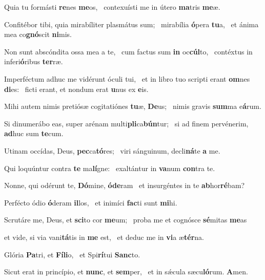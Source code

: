 \item Quia tu formásti \textbf{re}nes \textbf{me}os,~\psstar{} contexuísti me in útero \textbf{ma}tris \textbf{me}æ.

\item Confitébor tibi, quia mirabíliter plasmátus sum;~\pscross{} mirabília \textbf{ó}pera \textbf{tu}a,~\psstar{} et ánima mea co\textbf{gnó}scit \textbf{ni}mis.

\item Non sunt abscóndita ossa mea a te,~\pscross{} cum factus sum \textbf{in} oc\textbf{cúl}to,~\psstar{} contéxtus in inferi\textbf{ó}ribus \textbf{ter}ræ.

\item Imperféctum adhuc me vidérunt óculi tui,~\pscross{} et in libro tuo scripti erant \textbf{om}nes \textbf{di}es:~\psstar{} ficti erant, et nondum erat \textbf{u}nus ex \textbf{e}is.

\item Mihi autem nimis pretiósæ cogitatiónes \textbf{tu}æ, \textbf{De}us;~\psstar{} nimis gravis \textbf{sum}ma e\textbf{á}rum.

\item Si dinumerábo eas, super arénam multi\textbf{pli}ca\textbf{bún}tur;~\psstar{} si ad finem pervénerim, \textbf{ad}huc sum \textbf{te}cum.

\item Utinam occídas, Deus, \textbf{pec}ca\textbf{tó}res;~\psstar{} viri sánguinum, decli\textbf{ná}te \textbf{a} me.

\item Qui loquúntur contra \textbf{te} ma\textbf{lí}gne:~\psstar{} exaltántur in \textbf{va}num \textbf{con}tra te.

\item Nonne, qui odérunt te, \textbf{Dó}mine, \textbf{ó}\textbf{de}ram~\psstar{} et insurgéntes in te \textbf{ab}hor\textbf{ré}bam?

\item Perfécto ódio \textbf{ó}deram \textbf{il}los,~\psstar{} et inimíci \textbf{fac}ti sunt \textbf{mi}hi.

\item Scrutáre me, Deus, et \textbf{sci}to cor \textbf{me}um;~\psstar{} proba me et cognósce \textbf{sé}mitas \textbf{me}as

\item et vide, si via vani\textbf{tá}tis in \textbf{me} est,~\psstar{} et deduc me in \textbf{vi}a æ\textbf{tér}na.

\item Glória \textbf{Pa}tri, et \textbf{Fí}\textbf{li}o,~\psstar{} et Spi\textbf{rí}tui \textbf{Sanc}to.

\item Sicut erat in princípio, et \textbf{nunc}, et \textbf{sem}per,~\psstar{} et in sǽcula sæcu\textbf{ló}rum. \textbf{A}men.
